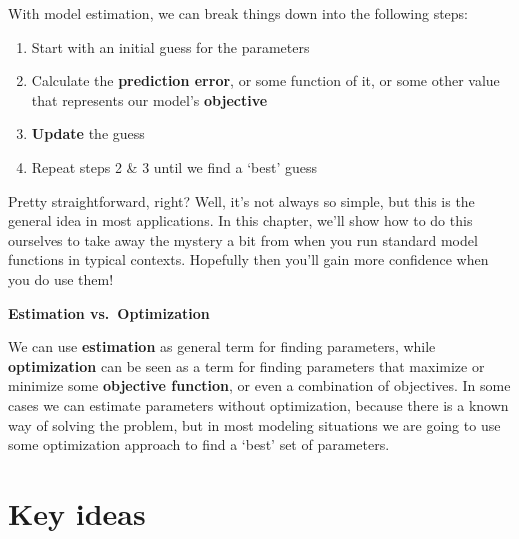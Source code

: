 \documentclass[
  letterpaper,
]{krantz}
\providecommand{\tightlist}{%
  \setlength{\itemsep}{0pt}\setlength{\parskip}{0pt}}\usepackage{longtable,booktabs,array}
\begin{document}
With model estimation, we can break things down into the following
steps:

\begin{enumerate}
\def\labelenumi{\arabic{enumi}.}
\tightlist
\item
  Start with an initial guess for the parameters
\item
  Calculate the \textbf{prediction error}, or some function of it, or
  some other value that represents our model's \textbf{objective}
\item
  \textbf{Update} the guess
\item
  Repeat steps 2 \& 3 until we find a `best' guess
\end{enumerate}

Pretty straightforward, right? Well, it's not always so simple, but this
is the general idea in most applications. In this chapter, we'll show
how to do this ourselves to take away the mystery a bit from when you
run standard model functions in typical contexts. Hopefully then you'll
gain more confidence when you do use them!

\begin{tcolorbox}[enhanced jigsaw, leftrule=.75mm, colback=white, opacityback=0, left=2mm, arc=.35mm, toprule=.15mm, rightrule=.15mm, breakable, bottomrule=.15mm]

\textbf{Estimation vs.~Optimization}\vspace{2mm}

We can use \textbf{estimation} as general term for finding parameters,
while \textbf{optimization} can be seen as a term for finding parameters
that maximize or minimize some \textbf{objective function}, or even a
combination of objectives. In some cases we can estimate parameters
without optimization, because there is a known way of solving the
problem, but in most modeling situations we are going to use some
optimization approach to find a `best' set of parameters.

\end{tcolorbox}

\section{Key ideas}\label{key-ideas-2}
\end{document}

